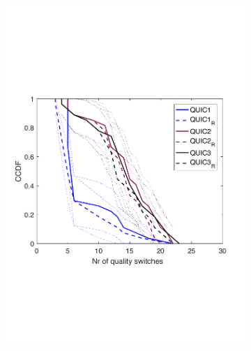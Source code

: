 \begin{figure}[t!]
\begin{subfigure}[t]{0.33\textwidth}
    \includegraphics[trim={0 7cm 0 7cm}, scale=0.25]{figures/CDF_cntswitch_squad_parallel_quic_nd18.pdf}
    \caption{}
    \label{fig:pquiccntsw}
  \end{subfigure}
  \begin{subfigure}[t]{0.33\textwidth}
  \captionsetup{justification=centering,margin=1.5cm}

\end{subfigure}
\end{figure}
